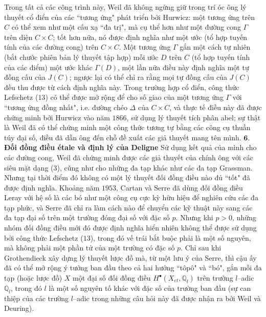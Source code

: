 \begin{multicols}{2}
	\vskip 0.1cm
	Trong tất cả các công trình này, Weil đã không ngừng giữ trong trí óc ông lý thuyết cổ điển của các ``tương ứng" phát triển bởi Hurwicz: một tương ứng trên $C$ có thể xem như một cấu xạ ``đa trị", mà cụ thể hơn như một đường cong $\Gamma$ trên diện $C \times C$; tốt hơn nữa, nó được định nghĩa như một ước (tổ hợp tuyến tính của các đường cong) trên $C \times C$. Một tương ứng $\Gamma$ gắn một cách tự nhiên (bắt chước phiên bản lý thuyết tập hợp) mỗi ước $D$ trên $C$ (tổ hợp tuyến tính của các điểm) một ước khác $\Gamma(D)$, một lần nữa điều này định nghĩa một tự đồng cấu của $J(C)$; ngược lại có thể chỉ ra rằng mọi tự đồng cấu của $J(C)$ đều thu được từ cách định nghĩa này. Trong trường hợp cổ điển, công thức Lefschetz ($13$) có thể được mở rộng để cho số giao của một tương ứng $\Gamma$ với ``tương ứng đồng nhất", i.e. đường chéo $\Delta$ của $C \times C$, và thực tế điều này đã được chứng minh bởi Hurwicz vào năm $1866$, sử dụng lý thuyết tích phân abel; sự thật là Weil đã có thể chứng minh một công thức tương tự bằng các công cụ thuần túy đại số, điều đã dẫn ông đến chỗ đề xuất các giả thuyết mang tên mình.
	\vskip 0.1cm
	$\pmb{6.}$ \textbf{\color{duongvaotoanhoc}Đối đồng điều \'etale và định lý của Deligne}
	\vskip 0.1cm
	Sử dụng kết quả của mình cho các đường cong, Weil đã chứng minh được các giả thuyết của chính ông với các siêu mặt dạng ($3$), cũng như cho những đa tạp khác như các đa tạp Grassman. Nhưng tại thời điểm đó không có một lý thuyết đối đồng điều nào đủ ``tốt" đã được định nghĩa. Khoảng năm $1953$, Cartan và Serre đã dùng đối đồng điều Leray với hệ số là các bó như một công cụ cực kỳ hữu hiệu để nghiên cứu các đa tạp phức, và Serre đã chỉ ra làm cách nào để chuyển các kỹ thuật này sang các đa tạp đại số trên một trường đóng đại số với đặc số $p$. Nhưng khi $p>0$, những nhóm đối đồng điều mới đó được định nghĩa hiển nhiên không thể được sử dụng bởi công thức Lefschetz ($13$), trong đó vế trái bắt buộc phải là một số nguyên, mà không phải một phần tử của một trường có đặc số $p$. Chỉ sau khi Grothendieck xây dựng lý thuyết lược đồ mà, từ một lưu ý của Serre, thì cậu ấy đã có thể mở rộng ý tưởng ban đầu theo cả hai hướng ``tôpô" và ``bó", gắn mỗi đa tạp (hoặc lược đồ) $X$ một đại số đối đồng điều $H^{\bullet}(X_{et},\mathbb{Q}_l)$ trên trường $l$--adic $\mathbb{Q}_l$, trong đó $l$ là một số nguyên tố khác với đặc số của trường ban đầu (sự can thiệp của các trường $l$--adic trong những câu hỏi này đã được nhận ra bởi Weil và Deuring).
	\vskip 0.1cm

\end{multicols}
